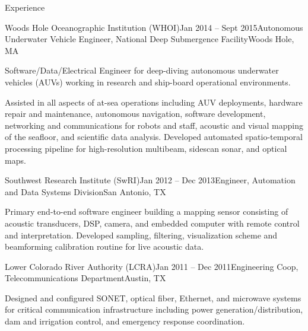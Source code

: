 \documentclass{resume} %
\begin{document}
\begin{rSection}{Experience}
\begin{rSubsection}{Woods Hole Oceanographic Institution (WHOI)}{Jan 2014 -- Sept 2015}{Autonomous Underwater Vehicle Engineer, National Deep Submergence Facility}{Woods Hole, MA}
\item{Software/Data/Electrical Engineer for deep-diving autonomous underwater vehicles (AUVs) working in research and ship-board operational environments. }
\item{Assisted in all aspects of at-sea operations including AUV deployments, hardware repair and maintenance, autonomous navigation, software development, networking and communications for robots and staff, acoustic and visual mapping of the seafloor, and scientific data analysis. Developed automated spatio-temporal processing pipeline for high-resolution multibeam, sidescan sonar, and optical maps.}
\end{rSubsection}
	\vspace{-.2cm}
	\newpage
\begin{rSubsection}{Southwest Research Institute (SwRI)}{Jan 2012 -- Dec 2013}{Engineer, Automation and Data Systems Division}{San Antonio, TX}{}
\item{Primary end-to-end software engineer building a mapping sensor consisting of acoustic transducers, DSP, camera, and embedded computer with remote control and interpretation. Developed sampling, filtering, visualization scheme and beamforming calibration routine for live acoustic data.}
\end{rSubsection}
\begin{rSubsection}{Lower Colorado River Authority (LCRA)}{Jan 2011 -- Dec 2011}{Engineering Coop, Telecommunications Department}{Austin, TX}
\item{Designed and configured SONET, optical fiber, Ethernet, and microwave systems for critical communication infrastructure including power generation/distribution, dam and irrigation control, and emergency response coordination. }
\end{rSubsection}
\end{rSection}
\end{document}
